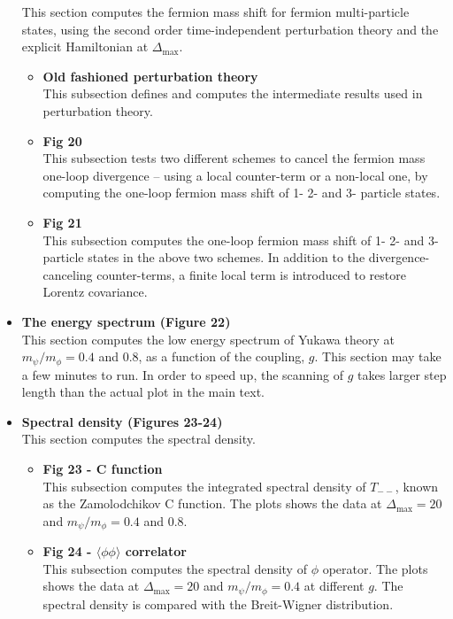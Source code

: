 \documentclass[12pt]{article}
\def\>{\rangle}
\def\<{\langle}
\newcommand\De\Delta
\newcommand{\Dmax}{\De_{\max}}
\begin{document}
\begin{itemize}
This section computes the fermion mass shift for fermion multi-particle states, using the second order time-independent perturbation theory and the explicit Hamiltonian at $\Dmax$.
  \begin{itemize}
  \item \textbf{Old fashioned perturbation theory}\\
  This subsection defines and computes the intermediate results used in perturbation theory. 
  \item \textbf{Fig 20}\\
  This subsection tests two different schemes to cancel the fermion mass one-loop divergence -- using a local counter-term or a non-local one, by computing the one-loop fermion mass shift of 1- 2- and 3- particle states.
  \item \textbf{Fig 21}\\
  This subsection computes the one-loop fermion mass shift of 1- 2- and 3- particle states in the above two schemes. In addition to the divergence-canceling counter-terms, a finite local term is introduced to restore Lorentz covariance. 
  \end{itemize}
\item \textbf{The energy spectrum (Figure 22)}\\
This section computes the low energy spectrum of Yukawa theory at $m_\psi/m_\phi = 0.4$ and $0.8$, as a function of the coupling, $g$. This section may take a few minutes to run. In order to speed up, the scanning of $g$ takes larger step length than the actual plot in the main text.
\item \textbf{Spectral density (Figures 23-24)}\\
This section computes the spectral density.
  \begin{itemize}
  \item \textbf{Fig 23 - C function}\\
  This subsection computes the integrated spectral density of $T_{--}$, known as the Zamolodchikov C function. The plots shows the data at $\Dmax=20$ and $m_\psi/m_\phi = 0.4$ and $0.8$.
  \item \textbf{Fig 24 - $\<\phi\phi\>$ correlator}\\
  This subsection computes the spectral density of $\phi$ operator. The plots shows the data at $\Dmax=20$ and $m_\psi/m_\phi = 0.4$ at different $g$. The spectral density is compared with the Breit-Wigner distribution.
  \end{itemize}
\end{itemize}
\end{document}
